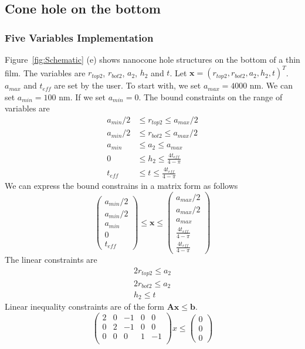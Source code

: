 \documentclass[12pt]{article}
\numberwithin{equation}{section}
\numberwithin{equation}{section}
\begin{document}
 \subsection{Cone hole on the bottom}
 \subsubsection{Five Variables Implementation}
Figure~\ref{fig:Schematic} (e) shows nanocone hole structures on the bottom of a thin film.  
The variables are $r_{top2}$, $r_{bot2}$, $a_2$, $h_2$ and $t$.  
Let $\mathbf{x} = \left ( r_{top2}, r_{bot2}, a_2, h_2, t  \right )^T$.
$a_{max}$ and $t_{eff}$ are set by the user.  To start with, we set $a_{max} = 4000$ nm.
We can set $a_{min} = 100$ nm.  If we set $a_{min} = 0$.
The bound constraints on the range of variables are
\begin{align*}
a_{min}/2 & \leq r_{top2} \leq a_{max}/2 \\
a_{min}/2 & \leq r_{bot2} \leq a_{max}/2 \\
a_{min} & \leq a_{2} \leq a_{max} \\
0 & \leq h_2 \leq \frac {4t_{eff}}{4-\pi} \\
t_{eff} & \leq t \leq \frac {4t_{eff}}{4-\pi}
\end{align*}
We can express the bound constrains in a matrix form as follows
\begin{equation}
\left(
\begin{matrix}
a_{min}/2\\ 
a_{min}/2\\
a_{min}\\ 
0 \\  
t_{eff} 
\end{matrix} \right )
\leq \mathbf{x}
 \leq 
 \left(
\begin{matrix}
a_{max}/2 \\ a_{max}/2 \\ a_{max} \\ \frac {4t_{eff}}{4-\pi} \\ \frac {4t_{eff}}{4-\pi}
\end{matrix} \right )
\end{equation}
The linear constraints are 
\begin{align*}   
2r_{top2} \leq a_2 \\
2r_{bot2} \leq a_2 \\
h_2 \leq t
\end{align*}
Linear inequality constraints are of the form $\mathbf{A} \mathbf{x} \leq \mathbf{b}$.
\begin{equation}
\left(
\begin{matrix}
2 & 0 & -1 & 0 & 0 \\
0 & 2 & -1 & 0 & 0 \\
0 & 0 & 0 & 1 & -1 \\
\end{matrix}
\right ) x  \leq \left ( \begin{matrix} 0\\ 0\\ 0 \end{matrix} \right ) 
\end{equation}
\end{document}
